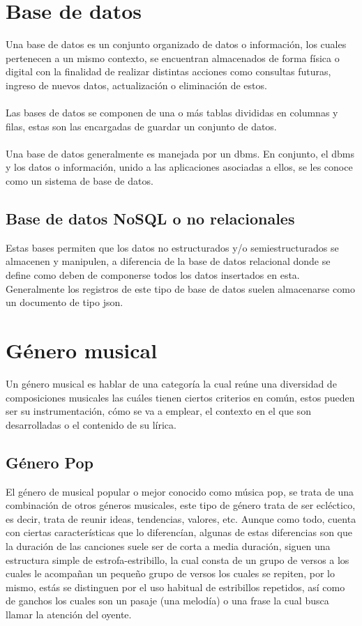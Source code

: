 \documentclass[12pt, a4paper, titlepage]{report}
\begin{document}
        \section{Base de datos}
        
        Una base de datos es un conjunto organizado de datos o información, los cuales pertenecen a un mismo contexto, se encuentran almacenados de forma física o digital con la finalidad de realizar distintas acciones como consultas futuras, ingreso de nuevos datos, actualización o eliminación de estos.\\\\
		Las bases de datos se componen de una o más tablas divididas en columnas y filas, estas son las encargadas de guardar un conjunto de datos.\\\\
		Una base de datos generalmente es manejada por un \acrfull{dbms}. En conjunto, el \acrshort{dbms} y los datos o información, unido a las aplicaciones asociadas a ellos, se les conoce como un sistema de base de datos.\cite{refQueEsBD}\par
			\subsection{Base de datos NoSQL o no relacionales}
			Estas bases permiten que los datos no estructurados y/o semiestructurados se almacenen y manipulen, a diferencia de la base de datos relacional donde se define como deben de componerse todos los datos insertados en esta. Generalmente los registros de este tipo de base de datos suelen almacenarse como un documento de tipo \acrshort{json}.\par
		
		\newpage
		\section{Género musical}
		Un género musical es hablar de una categoría la cual reúne una diversidad de composiciones musicales las cuáles tienen ciertos criterios en común, estos pueden ser su instrumentación, cómo se va a emplear, el contexto en el que son desarrolladas o el contenido de su lírica.
		
			\subsection{Género Pop}
			El género de musical popular o mejor conocido como música pop, se trata de una combinación de otros géneros musicales, este tipo de género trata de ser ecléctico, es decir, trata de reunir ideas, tendencias, valores, etc. Aunque como todo, cuenta con ciertas características que lo diferencían, algunas de estas diferencias son que la duración de las canciones suele ser de corta a media duración, siguen una estructura simple de estrofa-estribillo, la cual consta de un grupo de versos a los cuales le acompañan un pequeño grupo de versos los cuales se repiten, por lo mismo, estás se distinguen por el uso habitual de estribillos repetidos, así como de ganchos los cuales son un pasaje (una melodía) o una frase la cual busca llamar la atención del oyente.
	    
\end{document}
